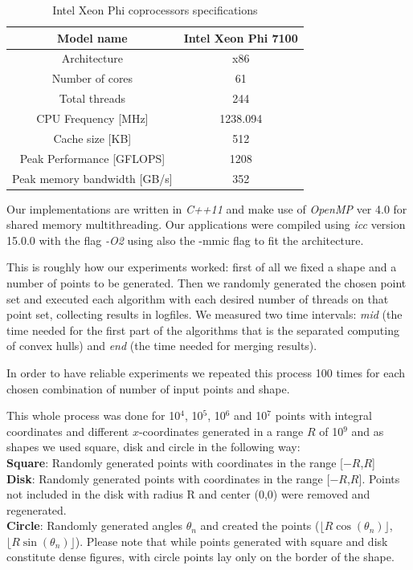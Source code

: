 \documentclass[letterpaper]{article}
\theoremstyle{definition}
\begin{document}
\begin{table}[!ht]
\begin{tabular}{|c|c|}
\hline Model name				& Intel Xeon Phi 7100\\
\hline Architecture				& x86\\
\hline Number of cores			& 61\\
\hline Total threads				& 244\\
\hline CPU Frequency [MHz]		& 1238.094\\
\hline Cache size [KB]			& 512\\
\hline Peak Performance [GFLOPS]	& 1208\\
\hline Peak memory bandwidth [GB/s]		& 352\\
\hline
\end{tabular}
\caption{Intel Xeon Phi coprocessors specifications \cite{XeonPhi}}
\end{table}

Our implementations are written in \textit{C++11} and make use of \textit{OpenMP} ver 4.0 \cite{OpenMP} for shared memory multithreading.
Our applications were compiled using \textit{icc} version 15.0.0 with the flag \textit{-O2} using also the -mmic flag to fit the architecture.

This is roughly how our experiments worked:
first of all we fixed a shape and a number of points to be generated. Then we randomly generated the chosen point set and executed each algorithm with each desired number of threads on that point set, collecting results in logfiles. We measured two time intervals: \textit{mid} (the time needed for the first part of the algorithms that is the separated computing of convex hulls) and \textit{end} (the time needed for merging results).

In order to have reliable experiments we repeated this process 100 times for each chosen combination of number of input points and shape.

This whole process was done for 10$^4$, 10$^5$, 10$^6$ and 10$^7$ points with integral coordinates and different $x$-coordinates generated in a range $R$ of 10$^9$ and as shapes we used square, disk and circle in the following way:\\
{\bf Square}: Randomly generated points with coordinates in the range [$-R$,$R$]\\
{\bf Disk}: Randomly generated points with coordinates in the range [$-R$,$R$]. Points not included in the disk with radius R and center (0,0) were removed and regenerated.\\
{\bf Circle}: Randomly generated angles $\theta_n$ and created the points ($\lfloor R \cos(\theta_n)\rfloor$, $\lfloor R \sin(\theta_n)\rfloor$). Please note that while points generated with square and disk constitute dense figures, with circle points lay only on the border of the shape.
\end{document}
